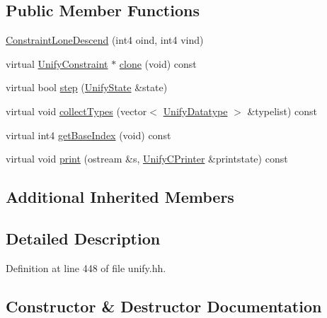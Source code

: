 \subsection*{Public Member Functions}
\begin{DoxyCompactItemize}
\item 
\mbox{\hyperlink{class_constraint_lone_descend_a4c469bc8f7ade8efd49ea4e058d6e93b}{Constraint\+Lone\+Descend}} (int4 oind, int4 vind)
\item 
virtual \mbox{\hyperlink{class_unify_constraint}{Unify\+Constraint}} $\ast$ \mbox{\hyperlink{class_constraint_lone_descend_a8dea8363968160213540242b07aaf972}{clone}} (void) const
\item 
virtual bool \mbox{\hyperlink{class_constraint_lone_descend_a792c77fd74feb948f4fcf8f3ce57b4f3}{step}} (\mbox{\hyperlink{class_unify_state}{Unify\+State}} \&state)
\item 
virtual void \mbox{\hyperlink{class_constraint_lone_descend_a4ef34bbfea218b6d879766a2d206a811}{collect\+Types}} (vector$<$ \mbox{\hyperlink{class_unify_datatype}{Unify\+Datatype}} $>$ \&typelist) const
\item 
virtual int4 \mbox{\hyperlink{class_constraint_lone_descend_a006603f95347698cc1d8719d642cdcc0}{get\+Base\+Index}} (void) const
\item 
virtual void \mbox{\hyperlink{class_constraint_lone_descend_a22365ca256a752326c21a3f71c796203}{print}} (ostream \&s, \mbox{\hyperlink{class_unify_c_printer}{Unify\+C\+Printer}} \&printstate) const
\end{DoxyCompactItemize}
\subsection*{Additional Inherited Members}


\subsection{Detailed Description}


Definition at line 448 of file unify.\+hh.



\subsection{Constructor \& Destructor Documentation}
\mbox{\label{class_constraint_lone_descend_a4c469bc8f7ade8efd49ea4e058d6e93b}} 
